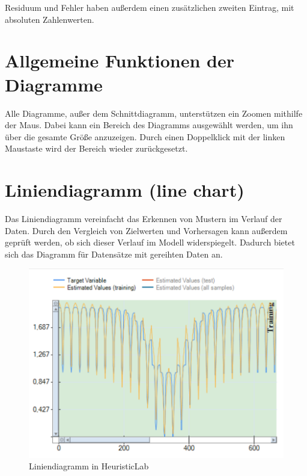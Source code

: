 \vspace{\baselineskip}

\noindent Residuum und Fehler haben außerdem einen zusätzlichen zweiten Eintrag, mit absoluten Zahlenwerten.

\section{Allgemeine Funktionen der Diagramme}
\label{sec:allgemeine_funktionen_diagramme}

Alle Diagramme, außer dem Schnittdiagramm, unterstützen ein Zoomen mithilfe der Maus. Dabei kann ein Bereich des Diagramms ausgewählt werden, um ihn über die gesamte Größe anzuzeigen. Durch einen Doppelklick mit der linken Maustaste wird der Bereich wieder zurückgesetzt.


\section{Liniendiagramm (line chart)}
\label{sec:line-chart}

Das Liniendiagramm vereinfacht das Erkennen von Mustern im Verlauf der Daten. Durch den Vergleich von Zielwerten und Vorhersagen kann außerdem geprüft werden, ob sich dieser Verlauf im Modell widerspiegelt. Dadurch bietet sich das Diagramm für Datensätze mit gereihten Daten an.

\begin{figure}[H]
    \centering
    \includegraphics[height=.6\textwidth]{images/line-chart_small.png}
    \caption{Liniendiagramm in HeuristicLab}
    \label{fig:example_line_chart}
\end{figure}

